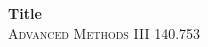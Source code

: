 \documentclass[11pt]{article}\usepackage{graphicx, color}
\begin{document}
\begin{center}

{ \bfseries Title}\\%
\textsc{Advanced Methods III 140.753}\\
\normalsize
\end{center}



% 
% 

\end{document}
